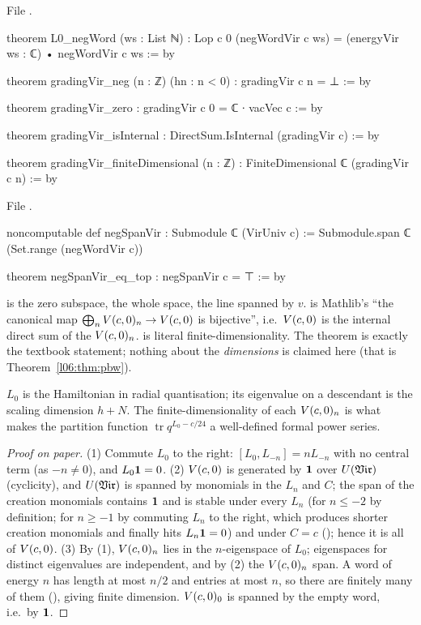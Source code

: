 File .
\begin{leancode}
theorem L0_negWord (ws : List ℕ) :
    Lop c 0 (negWordVir c ws) = (energyVir ws : ℂ) • negWordVir c ws := by

theorem gradingVir_neg (n : ℤ) (hn : n < 0) : gradingVir c n = ⊥ := by

theorem gradingVir_zero : gradingVir c 0 = ℂ ∙ vacVec c := by

theorem gradingVir_isInternal : DirectSum.IsInternal (gradingVir c) := by

theorem gradingVir_finiteDimensional (n : ℤ) : FiniteDimensional ℂ (gradingVir c n) := by
\end{leancode}
File .
\begin{leancode}
noncomputable def negSpanVir : Submodule ℂ (VirUniv c) :=
  Submodule.span ℂ (Set.range (negWordVir c))

theorem negSpanVir_eq_top : negSpanVir c = ⊤ := by
\end{leancode}

\begin{dictionary}
 is the zero subspace,  the whole space,  the line spanned by $v$.
\allowbreak{} is Mathlib's ``the canonical map
$\bigoplus_nV(c,0)_n\to V(c,0)$ is bijective'', i.e.\ $V(c,0)$ is the internal direct sum of the
$V(c,0)_n$.  is literal finite-dimensionality. The theorem
is exactly the textbook statement; nothing about the \emph{dimensions} is claimed here (that is
Theorem~\ref{l06:thm:pbw}).
\end{dictionary}

\begin{physics}
$L_0$ is the Hamiltonian in radial quantisation; its eigenvalue on a descendant is the scaling dimension
$h+N$. The finite-dimensionality of each $V(c,0)_n$ is what makes the partition function
$\operatorname{tr}q^{L_0-c/24}$ a well-defined formal power series.
\end{physics}

\begin{proof}[Proof on paper]
(1) Commute $L_0$ to the right: $[L_0,L_{-n}] = nL_{-n}$ with no central term (as $-n\ne0$), and
$L_0\mathbf{1} = 0$. (2) $V(c,0)$ is generated by $\mathbf{1}$ over $U(\mathfrak{Vir})$ (cyclicity), and $U(\mathfrak{Vir})$ is
spanned by monomials in the $L_n$ and $C$; the span of the creation monomials contains $\mathbf{1}$ and is
stable under every $L_n$ (for $n\le-2$ by definition; for $n\ge-1$ by commuting $L_n$ to the right,
which produces shorter creation monomials and finally hits $L_n\mathbf{1} = 0$) and under $C = c$
(); hence it is all of $V(c,0)$. (3) By (1), $V(c,0)_n$ lies in the
$n$-eigenspace of $L_0$; eigenspaces for distinct eigenvalues are independent, and by (2) the
$V(c,0)_n$ span. A word of energy $n$ has length at most $n/2$ and entries at most $n$, so there are
finitely many of them (), giving finite dimension. $V(c,0)_0$ is spanned by the
empty word, i.e.\ by $\mathbf{1}$.
\end{proof}

